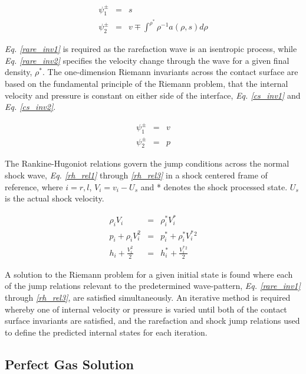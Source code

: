 \documentclass[a4paper,10pt]{article}
\begin{document}
\begin{eqnarray}
\psi_{1}^{\pm} &=& s \label{rare_inv1} \\
\psi_{2}^{\pm} &=& v \mp \int^{\rho^{*}} \rho^{-1} a ( \rho, s) d \rho \label{rare_inv2}
\end{eqnarray}

\emph{Eq. \ref{rare_inv1}} is required as the rarefaction wave is
an isentropic process, while \emph{Eq. \ref{rare_inv2}} specifies
the velocity change through the wave for a given final density, $
\rho^{*} $.  The one-dimension Riemann invariants across the
contact surface are based on the fundamental principle of the
Riemann problem, that the internal velocity and pressure is
constant on either side of the interface, \emph{Eq. \ref{cs_inv1}}
and \emph{Eq. \ref{cs_inv2}}.

\begin{eqnarray}
\psi_{1}^{\pm} &=& v \label{cs_inv1} \\
\psi_{2}^{\pm} &=& p \label{cs_inv2}
\end{eqnarray}

The Rankine-Hugoniot relations govern the jump conditions across
the normal shock wave, \emph{Eq. \ref{rh_rel1}} through
\emph{\ref{rh_rel3}} in a shock centered frame of reference, where
$i=r,l$, $V_{i} = v_{i} - U_{s}$ and * denotes the shock processed
state.  $U_{s}$ is the actual shock velocity.

\begin{eqnarray}
\rho_{i} V_{i} &=& \rho_{i}^{*} V_{i}^{*} \label{rh_rel1} \\
p_{i} + \rho_{i} V_{i}^{2} &=& p_{i}^{*} + \rho_{i}^{*} V_{i}^{*}{}^{2} \label{rh_rel2} \\
h_{i} + \frac{V_{i}^{2}}{2} &=& h_{i}^{*} + \frac{V_{i}^{*}{}^{2}}{2} \label{rh_rel3}
\end{eqnarray}

A solution to the Riemann problem for a given initial state is
found where each of the jump relations relevant to the
predetermined wave-pattern, \emph{Eq. \ref{rare_inv1}} through
\emph{\ref{rh_rel3}}, are satisfied simultaneously.  An iterative
method is required whereby one of internal velocity or pressure is
varied until both of the contact surface invariants are satisfied,
and the rarefaction and shock jump relations used to define
the predicted internal states for each iteration.

\subsection{Perfect Gas Solution}
\end{document}
